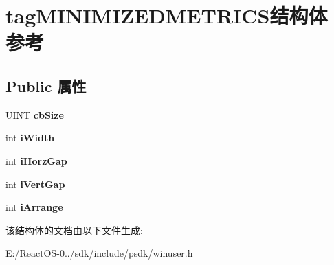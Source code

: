 \hypertarget{structtag_m_i_n_i_m_i_z_e_d_m_e_t_r_i_c_s}{}\section{tag\+M\+I\+N\+I\+M\+I\+Z\+E\+D\+M\+E\+T\+R\+I\+C\+S结构体 参考}
\label{structtag_m_i_n_i_m_i_z_e_d_m_e_t_r_i_c_s}
\subsection*{Public 属性}
\begin{DoxyCompactItemize}
\item 
\mbox{\label{structtag_m_i_n_i_m_i_z_e_d_m_e_t_r_i_c_s_a3d78a417fbb6b7aadd56f719ee3ad72b}} 
U\+I\+NT {\bfseries cb\+Size}
\item 
\mbox{\label{structtag_m_i_n_i_m_i_z_e_d_m_e_t_r_i_c_s_a39d3a590da5776847bc64f91858de191}} 
int {\bfseries i\+Width}
\item 
\mbox{\label{structtag_m_i_n_i_m_i_z_e_d_m_e_t_r_i_c_s_aed2e783dd112ee8e5da13872b9804c10}} 
int {\bfseries i\+Horz\+Gap}
\item 
\mbox{\label{structtag_m_i_n_i_m_i_z_e_d_m_e_t_r_i_c_s_a604e65ad8f50eb65a8fc78e1aa46e65b}} 
int {\bfseries i\+Vert\+Gap}
\item 
\mbox{\label{structtag_m_i_n_i_m_i_z_e_d_m_e_t_r_i_c_s_a9959697f04447ca4e7255ee8e7fbb6ca}} 
int {\bfseries i\+Arrange}
\end{DoxyCompactItemize}


该结构体的文档由以下文件生成\+:\begin{DoxyCompactItemize}
\item 
E\+:/\+React\+O\+S-\/0../sdk/include/psdk/winuser.\+h\end{DoxyCompactItemize}
